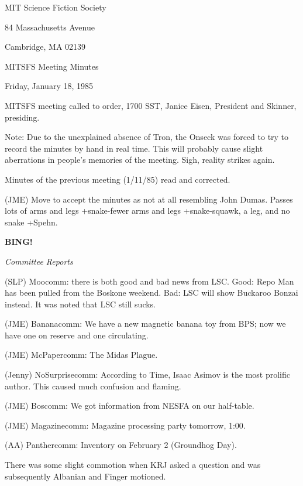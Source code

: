 \documentclass[12pt]{article}
\newcommand{\bing}{{\bf BING!} }
\newcommand{\goto}[1]{\bing \vskip 12pt \centerline{{\em{#1}}}}
\begin{document}
\begin{center}

MIT Science Fiction Society 

84 Massachusetts Avenue

Cambridge, MA 02139

\vspace{12pt}

MITSFS Meeting Minutes 

Friday, January 18, 1985

\end{center}
 
\vspace{18pt}

\setlength{\parskip}{6pt}

\noindent
MITSFS meeting called to order, 1700 SST,
Janice Eisen, President and Skinner, presiding.

Note: Due to the unexplained absence of Tron, the Onseck was forced to try to record the minutes by hand in real time. This will probably cause slight aberrations in people's memories of the meeting. Sigh, reality strikes again.

Minutes of the previous meeting (1/11/85) read and corrected.

(JME) Move to accept the minutes as not at all resembling John Dumas. Passes lots of arms and legs +snake-fewer arms and legs +snake-squawk, a leg, and no snake +Spehn.

\goto{Committee Reports}

(SLP) Moocomm: there is both good and bad news from LSC. Good: Repo Man has been pulled from the Boskone weekend. Bad: LSC will show Buckaroo Bonzai instead. It was noted that LSC still sucks.

(JME) Bananacomm: We have a new magnetic banana toy from BPS; now we have one on reserve and one circulating.

(JME) McPapercomm: The Midas Plague.

(Jenny) NoSurprisecomm: According to Time, Isaac Asimov is the most prolific author. This caused much confusion and flaming.

(JME) Boscomm: We got information from NESFA on our half-table.

(JME) Magazinecomm: Magazine processing party tomorrow, 1:00.

(AA) Panthercomm: Inventory on February 2 (Groundhog Day).

There was some slight commotion when KRJ asked a question and was subsequently Albanian and Finger motioned.
\end{document}
